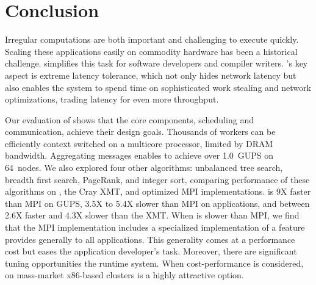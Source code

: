 \section{Conclusion}

Irregular computations are both important and challenging to execute
quickly.  Scaling these applications easily on commodity hardware has
been a historical challenge. \Grappa 
simplifies this task for software developers and compiler
writers. 
\Grappa's key aspect is extreme latency tolerance,
which not only hides network latency but also enables the system to
spend time on sophisticated work stealing and network optimizations,
trading latency for even more throughput.

Our evaluation of \Grappa shows that the core components, scheduling
and communication, achieve their design goals.  Thousands of workers
can be efficiently context switched on a multicore processor, limited by DRAM bandwidth.  Aggregating messages enables \Grappa to achieve
over 1.0~GUPS on 64~nodes.  We also explored four other algorithms:
unbalanced tree search, breadth first search, PageRank, and integer
sort, comparing performance of these algorithms on \Grappa, the Cray
XMT, and optimized MPI implementations. \Grappa is 9X faster than MPI on GUPS, 3.5X to 5.4X slower than MPI on applications, and between 2.6X faster and 4.3X slower than
the XMT. When \Grappa is slower than MPI, we find that the MPI
implementation includes a specialized implementation of a feature
\Grappa provides generally to all applications. This generality comes
at a performance cost but eases the application developer's
task. Moreover, there are significant tuning opportunities the \Grappa
runtime system.  When cost-performance is considered, \Grappa on mass-market
x86-based clusters is a highly attractive option.

